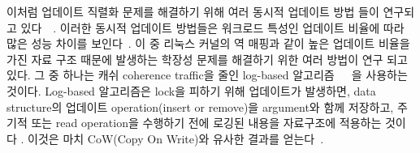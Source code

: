 \ifkor
이처럼 업데이트 직렬화 문제를 해결하기 위해 여러 동시적 업데이트 방법 들이 연구되고
있다~\cite{Arbel2014ConcurrentRCU}~\cite{Matveev2015RLU}.
이러한 동시적 업데이트 방법들은 워크로드 특성인 업데이트 비율에 따라 많은 성능 차이를
보인다~\cite{Matveev2015RLU}.
이 중 리눅스 커널의 역 매핑과 같이 높은 업데이트 비율을 가진 자료 구조 때문에 발생하는 학장성 문제를 해결하기 위한 여러 방법이 연구 되고
있다.
그 중 하나는 캐쉬 coherence traffic을 줄인 log-based
알고리즘~\cite{Shalev2006PLS}~\cite{Hendler2010FC}~\cite{SilasBoydWickizerPth}을
사용하는 것이다.
Log-based 알고리즘은 lock을 피하기 위해 업데이트가 발생하면, data structure의 업데이트
operation(insert or remove)을 argument와 함께 저장하고, 주기적 또는 read operation을 수행하기 전에
로깅된 내용을 자료구조에 적용하는 것이다 .
이것은 마치 CoW(Copy On Write)와 유사한 결과를 얻는다~\cite{PaulDetailLWN}.
\else
\fi


